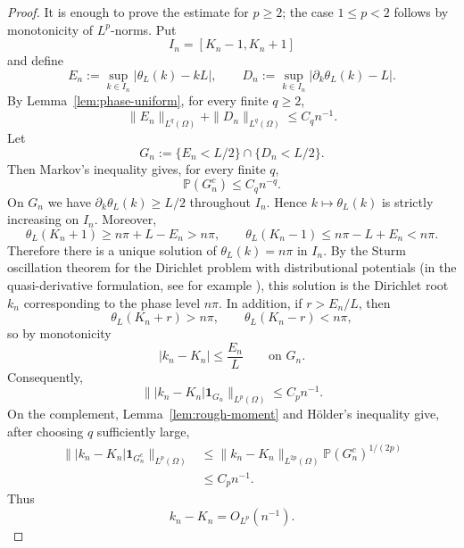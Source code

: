 \documentclass[11pt]{article}
\newcommand{\Prob}{\mathbb P}
\begin{document}
\begin{proof}
It is enough to prove the estimate for $p\ge2$; the case $1\le p<2$ follows by monotonicity of $L^p$-norms. Put
\[
    I_n=[K_n-1,K_n+1]
\]
and define
\[
    E_n:=\sup_{k\in I_n}|\theta_L(k)-kL|,
    \qquad
    D_n:=\sup_{k\in I_n}|\partial_k\theta_L(k)-L|.
\]
By Lemma~\ref{lem:phase-uniform}, for every finite $q\ge2$,
\[
    \|E_n\|_{L^q(\Omega)}+\|D_n\|_{L^q(\Omega)}\le C_q n^{-1}.
\]
Let
\[
    G_n:=\{E_n<L/2\}\cap\{D_n<L/2\}.
\]
Then Markov's inequality gives, for every finite $q$,
\[
    \Prob(G_n^c)\le C_q n^{-q}.
\]
On $G_n$ we have $\partial_k\theta_L(k)\ge L/2$ throughout $I_n$. Hence $k\mapsto\theta_L(k)$ is strictly increasing on $I_n$. Moreover,
\[
    \theta_L(K_n+1)\ge n\pi+L-E_n>n\pi,
    \qquad
    \theta_L(K_n-1)\le n\pi-L+E_n<n\pi.
\]
Therefore there is a unique solution of $\theta_L(k)=n\pi$ in $I_n$. By the Sturm oscillation theorem for the Dirichlet problem with distributional potentials (in the quasi-derivative formulation, see for example \cite{SavchukShkalikov,HrynivMykytyuk2012}), this solution is the Dirichlet root $k_n$ corresponding to the phase level $n\pi$. In addition, if $r>E_n/L$, then
\[
    \theta_L(K_n+r)>n\pi,
    \qquad
    \theta_L(K_n-r)<n\pi,
\]
so by monotonicity
\[
    |k_n-K_n|\le \frac{E_n}{L}
    \qquad\text{on }G_n.
\]
Consequently,
\[
    \bigl\||k_n-K_n|\mathbf 1_{G_n}\bigr\|_{L^p(\Omega)}\le C_p n^{-1}.
\]
On the complement, Lemma~\ref{lem:rough-moment} and H\"older's inequality give, after choosing $q$ sufficiently large,
\[
\begin{aligned}
    \bigl\||k_n-K_n|\mathbf 1_{G_n^c}\bigr\|_{L^p(\Omega)}
    &\le \|k_n-K_n\|_{L^{2p}(\Omega)}\Prob(G_n^c)^{1/(2p)}  \\
    &\le C_p n^{-1}.
\end{aligned}
\]
Thus
\[
    k_n-K_n=O_{L^p}(n^{-1}).
\]


\end{proof}
\end{document}
